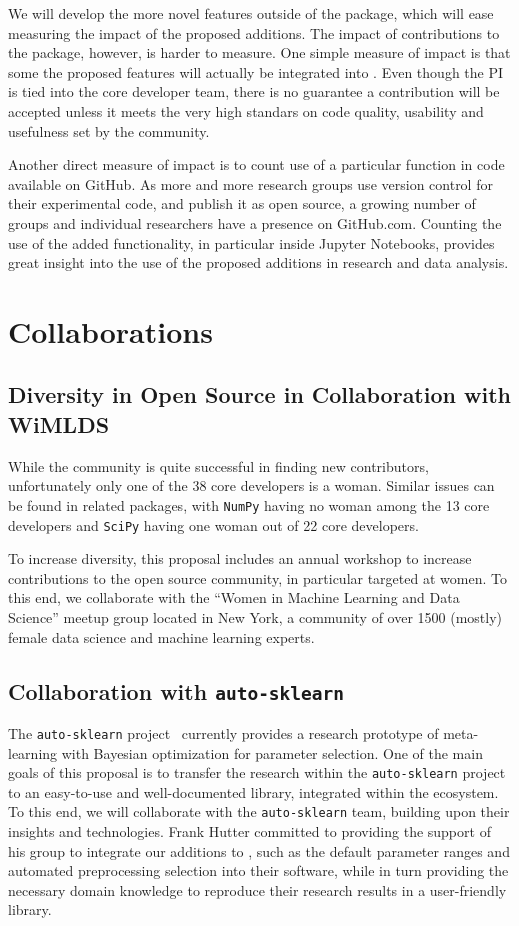 We will develop the more novel features outside of the \sklearn{} package, which will
ease measuring the impact of the proposed additions. The impact of contributions
to the \sklearn{} package, however, is harder to measure. One simple measure of impact
is that some the proposed features will actually be integrated into \sklearn{}.
Even though the PI is tied into the core developer team, there is no guarantee
a contribution will be accepted unless it meets the very high standars
on code quality, usability and usefulness set by the community.

Another direct measure of impact is to count use of a particular function in
code available on GitHub. As more and more research groups use version
control for their experimental code, and publish it as open source, a growing
number of groups and individual researchers have a presence on GitHub.com.
Counting the use of the added functionality, in particular inside Jupyter
Notebooks, provides great insight into the use of the proposed additions in
research and data analysis.


\section{Collaborations}
\subsection{Diversity in Open Source in Collaboration with WiMLDS}
While the \sklearn{} community is quite successful in finding new contributors,
unfortunately only one of the 38 \sklearn{} core developers is a woman.
Similar issues can be found in related packages, with \texttt{NumPy} having no
woman among the 13 core developers and \texttt{SciPy} having one woman out of
22 core developers.

To increase diversity, this proposal includes an annual workshop to increase
contributions to the open source community, in particular targeted at women.
To this end, we collaborate with the ``Women in Machine Learning and Data Science''
meetup group located in New York, a community of over 1500 (mostly) female data science and
machine learning experts.

\subsection{Collaboration with \texttt{auto-sklearn}}
The \texttt{auto-sklearn} project~\autocite{feurer-nips2015} currently provides
a research prototype of meta-learning with Bayesian optimization for parameter
selection. One of the main goals of this proposal is to transfer the research
within the \texttt{auto-sklearn} project to an easy-to-use and well-documented
library, integrated within the \sklearn{} ecosystem. To this end, we will
collaborate with the \texttt{auto-sklearn} team, building upon their insights
and technologies. Frank Hutter committed to providing the support of his group
to integrate our additions to \sklearn{}, such as the default parameter ranges
and automated preprocessing selection into their software, while in turn
providing the necessary domain knowledge to reproduce their research results in
a user-friendly library.


